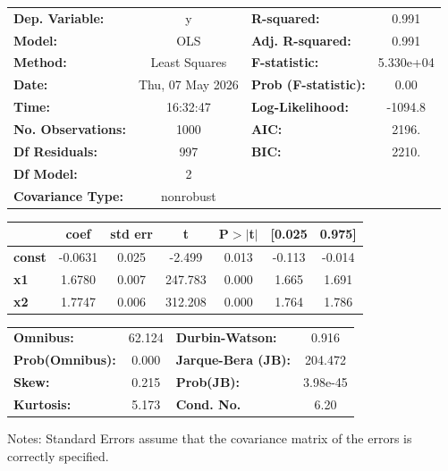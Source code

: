 \begin{center}
\begin{tabular}{lclc}
\toprule
\textbf{Dep. Variable:}    &        y         & \textbf{  R-squared:         } &     0.991   \\
\textbf{Model:}            &       OLS        & \textbf{  Adj. R-squared:    } &     0.991   \\
\textbf{Method:}           &  Least Squares   & \textbf{  F-statistic:       } & 5.330e+04   \\
\textbf{Date:}             & Thu, 07 May 2026 & \textbf{  Prob (F-statistic):} &     0.00    \\
\textbf{Time:}             &     16:32:47     & \textbf{  Log-Likelihood:    } &   -1094.8   \\
\textbf{No. Observations:} &        1000      & \textbf{  AIC:               } &     2196.   \\
\textbf{Df Residuals:}     &         997      & \textbf{  BIC:               } &     2210.   \\
\textbf{Df Model:}         &           2      & \textbf{                     } &             \\
\textbf{Covariance Type:}  &    nonrobust     & \textbf{                     } &             \\
\bottomrule
\end{tabular}
\begin{tabular}{lcccccc}
               & \textbf{coef} & \textbf{std err} & \textbf{t} & \textbf{P$> |$t$|$} & \textbf{[0.025} & \textbf{0.975]}  \\
\midrule
\textbf{const} &      -0.0631  &        0.025     &    -2.499  &         0.013        &       -0.113    &       -0.014     \\
\textbf{x1}    &       1.6780  &        0.007     &   247.783  &         0.000        &        1.665    &        1.691     \\
\textbf{x2}    &       1.7747  &        0.006     &   312.208  &         0.000        &        1.764    &        1.786     \\
\bottomrule
\end{tabular}
\begin{tabular}{lclc}
\textbf{Omnibus:}       & 62.124 & \textbf{  Durbin-Watson:     } &    0.916  \\
\textbf{Prob(Omnibus):} &  0.000 & \textbf{  Jarque-Bera (JB):  } &  204.472  \\
\textbf{Skew:}          &  0.215 & \textbf{  Prob(JB):          } & 3.98e-45  \\
\textbf{Kurtosis:}      &  5.173 & \textbf{  Cond. No.          } &     6.20  \\
\bottomrule
\end{tabular}
\end{center}

Notes: \newline
 [1] Standard Errors assume that the covariance matrix of the errors is correctly specified.